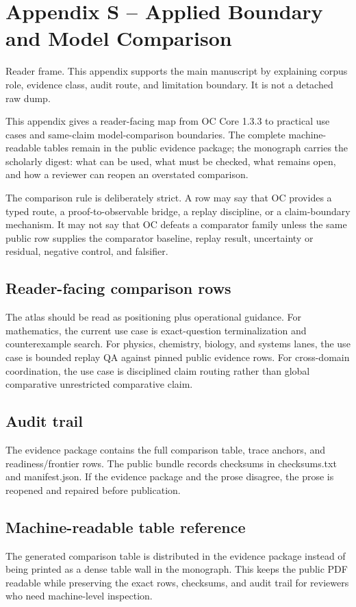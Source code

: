 \section{Appendix S -- Applied Boundary and Model Comparison}
Reader frame. This appendix supports the main manuscript by explaining corpus role, evidence class, audit route, and limitation boundary. It is not a detached raw dump.


\label{sec:oc-core-1-3-practical-utility-atlas}

This appendix gives a reader-facing map from OC Core 1.3.3 to practical use cases and same-claim model-comparison boundaries. The complete machine-readable tables remain in the public evidence package; the monograph carries the scholarly digest: what can be used, what must be checked, what remains open, and how a reviewer can reopen an overstated comparison.


The comparison rule is deliberately strict. A row may say that OC provides a typed route, a proof-to-observable bridge, a replay discipline, or a claim-boundary mechanism. It may not say that OC defeats a comparator family unless the same public row supplies the comparator baseline, replay result, uncertainty or residual, negative control, and falsifier.


\subsection{Reader-facing comparison rows}

The atlas should be read as positioning plus operational guidance. For mathematics, the current use case is exact-question terminalization and counterexample search. For physics, chemistry, biology, and systems lanes, the use case is bounded replay QA against pinned public evidence rows. For cross-domain coordination, the use case is disciplined claim routing rather than global comparative unrestricted comparative claim.


\subsection{Audit trail}

The evidence package contains the full comparison table, trace anchors, and readiness/frontier rows. The public bundle records checksums in checksums.txt and manifest.json. If the evidence package and the prose disagree, the prose is reopened and repaired before publication.


\subsection{Machine-readable table reference}

The generated comparison table is distributed in the evidence package instead of being printed as a dense table wall in the monograph. This keeps the public PDF readable while preserving the exact rows, checksums, and audit trail for reviewers who need machine-level inspection.
